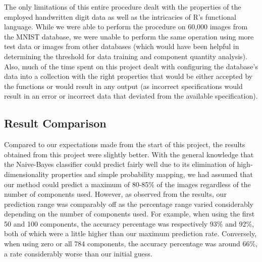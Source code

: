 \documentclass[twocolumn]{article}
\begin{document}
The only limitations of this entire procedure dealt with the properties of the employed handwritten digit data as well as the intricacies of R's functional language. While we were able to perform the procedure on 60,000 images from the MNIST database, we were unable to perform the same operation using more test data or images from other databases (which would have been helpful in determining the threshold for data training and component quantity analysis). Also, much of the time spent on this project dealt with configuring the database's data into a collection with the right properties that would be either accepted by the functions or would result in any output (as incorrect specifications would result in an error or incorrect data that deviated from the available specification).

\subsection{Result Comparison}
\label{subsec:comparison}

Compared to our expectations made from the start of this project, the results obtained from this project were slightly better. With the general knowledge that the Naive-Bayes classifier could predict fairly well due to its elimination of high-dimensionality properties and simple probability mapping, we had assumed that our method could predict a maximum of 80-85\% of the images regardless of the number of components used. However, as observed from the results, our prediction range was comparably off as the percentage range varied considerably depending on the number of components used. For example, when using the first 50 and 100 components, the accuracy percentage was respectively 93\% and 92\%, both of which were a little higher than our maximum prediction rate. Conversely, when using zero or all 784 components, the accuracy percentage was around 66\%, a rate considerably worse than our initial guess.
\end{document}
